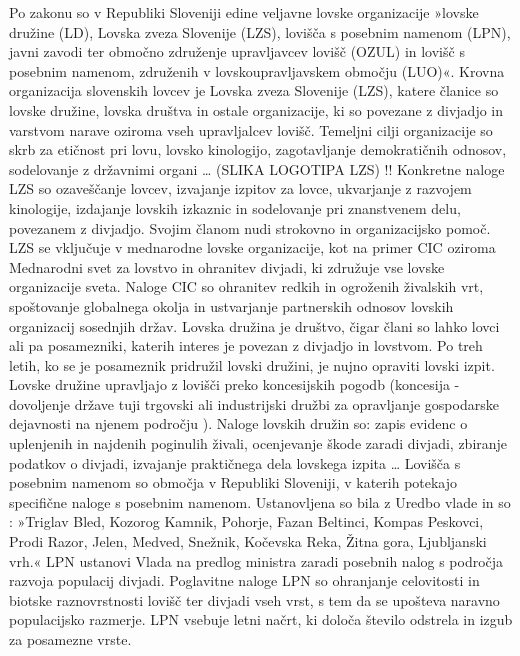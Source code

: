\documentclass[a4paper,12pt,openright]{book}
\begin{document}
Po zakonu so v Republiki Sloveniji edine veljavne lovske organizacije »lovske družine (LD), Lovska zveza Slovenije (LZS), lovišča s posebnim namenom (LPN), javni zavodi ter območno združenje upravljavcev lovišč (OZUL) in lovišč s posebnim namenom, združenih v lovskoupravljavskem območju (LUO)«\parencite[64]{Lov}. 
Krovna organizacija slovenskih lovcev je Lovska zveza Slovenije (LZS), katere članice so lovske družine, lovska društva in ostale organizacije, ki so povezane z divjadjo in varstvom narave oziroma vseh upravljalcev lovišč. 
Temeljni cilji organizacije so skrb za etičnost pri lovu, lovsko kinologijo, zagotavljanje demokratičnih odnosov, sodelovanje z državnimi organi … 
(SLIKA LOGOTIPA LZS) !!
Konkretne naloge LZS so ozaveščanje lovcev, izvajanje izpitov za lovce, ukvarjanje z razvojem kinologije, izdajanje lovskih izkaznic in sodelovanje pri znanstvenem delu, povezanem z divjadjo. 
Svojim članom nudi strokovno in organizacijsko pomoč. 
LZS se vključuje v mednarodne lovske organizacije, kot na primer CIC oziroma Mednarodni svet za lovstvo in ohranitev divjadi, ki združuje vse lovske organizacije sveta.
Naloge CIC so ohranitev redkih in ogroženih živalskih vrt, spoštovanje globalnega okolja in ustvarjanje partnerskih odnosov lovskih organizacij sosednjih držav.
Lovska družina je društvo, čigar člani so lahko lovci ali pa posamezniki, katerih interes je povezan z divjadjo in lovstvom. 
Po treh letih, ko se je posameznik pridružil lovski družini, je nujno opraviti lovski izpit.
Lovske družine upravljajo z lovišči preko koncesijskih pogodb (koncesija - dovoljenje države tuji trgovski ali industrijski družbi za opravljanje gospodarske dejavnosti na njenem področju \cite{fran}).
Naloge lovskih družin so: zapis evidenc o uplenjenih in najdenih poginulih živali, ocenjevanje škode zaradi divjadi, zbiranje podatkov o divjadi, izvajanje praktičnega dela lovskega izpita … 
Lovišča s posebnim namenom so območja v Republiki Sloveniji, v katerih potekajo specifične naloge s posebnim namenom.
Ustanovljena so bila z Uredbo vlade in so : »Triglav Bled, Kozorog Kamnik, Pohorje, Fazan Beltinci, Kompas Peskovci, Prodi Razor, Jelen, Medved, Snežnik, Kočevska Reka, Žitna gora, Ljubljanski vrh.«\parencite[65]{Lov}
LPN ustanovi Vlada na predlog ministra zaradi posebnih nalog s področja razvoja populacij divjadi. 
Poglavitne naloge LPN so ohranjanje celovitosti in biotske raznovrstnosti lovišč ter divjadi vseh vrst, s tem da se upošteva naravno populacijsko razmerje. 
LPN vsebuje letni načrt, ki določa število odstrela in izgub za posamezne vrste.\cite{Div_63_71}
\end{document}
